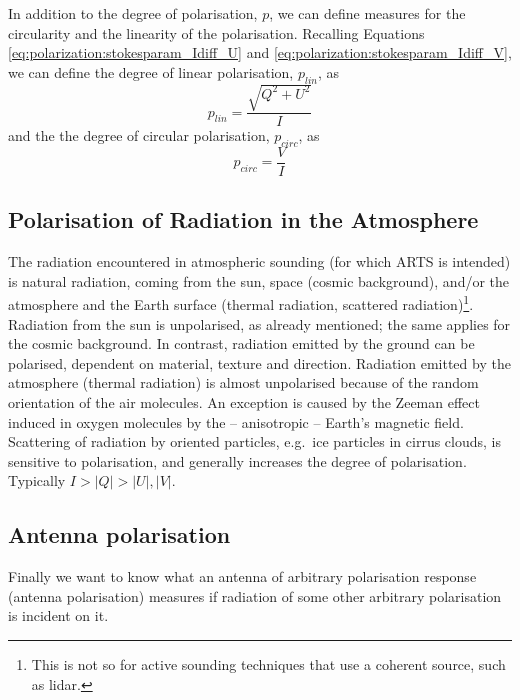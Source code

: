 In addition to the degree of polarisation, $p$, we can define measures
for the circularity and the linearity of the polarisation.
Recalling Equations \ref{eq:polarization:stokesparam_Idiff_U}
and \ref{eq:polarization:stokesparam_Idiff_V},
we can define the degree of linear polarisation, $p_{lin}$, as
\begin{equation}
  \label{eq:polarization:p_lin}
 p_{lin} = \frac{\sqrt{Q^2 + U^2}}{I} 
\end{equation}
and the the degree of circular polarisation, $p_{circ}$, as
\begin{equation}
  \label{eq:polarization:p_circ}
 p_{circ} = \frac{V}{I} 
\end{equation}


\subsection{Polarisation of Radiation in the Atmosphere}
\label{sec:polarization:atmosphere}
The radiation encountered in atmospheric sounding (for which ARTS is
intended) is natural radiation, coming from the sun, space (cosmic
background), and/or the atmosphere and the Earth surface (thermal
radiation, scattered radiation)\footnote{This is not so for active
  sounding techniques that use a coherent source, such as lidar.}.
Radiation from the sun is unpolarised, as already mentioned; the same
applies for the cosmic background.  In contrast,
radiation emitted by the ground can be polarised, dependent on
material, texture and direction.  Radiation emitted by the atmosphere
(thermal radiation) is almost unpolarised because of the random
orientation of the air molecules.  An exception is caused by the
Zeeman effect induced in oxygen molecules by the -- anisotropic --
Earth's magnetic field.  Scattering of radiation by oriented
particles, e.g.\ ice particles in cirrus clouds, is sensitive to polarisation,
and generally increases the degree of polarisation.  Typically $I > |Q| >
|U|,|V|$.


\subsection{Antenna polarisation}
\label{sec:polarization:antenna}
Finally we want to know what an antenna of arbitrary polarisation
response (antenna polarisation)
measures if radiation of some other arbitrary polarisation is incident
on it.

